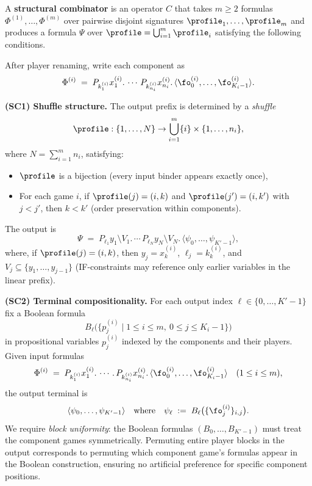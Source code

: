 \begin{definition}
\label{def:structural-combinator}
A \textbf{structural combinator} is an operator $C$ that takes $m \geq 2$ 
formulas $\Phi^{(1)}, \ldots, \Phi^{(m)}$ over pairwise disjoint signatures 
$\profile_1, \ldots, \profile_m$ and produces a formula 
$\Psi$ over $\profile = \bigcup_{i=1}^m \profile_i$ satisfying the following conditions.

After player renaming, write each component as
\[
\Phi^{(i)} \;=\; P_{k_1^{(i)}} x_1^{(i)}.\, \cdots\, P_{k_{n_i}^{(i)}} x_{n_i}^{(i)}.\,
\langle \fo_0^{(i)}, \ldots, \fo_{K_i-1}^{(i)} \rangle.
\]

\smallskip
\noindent\textbf{(SC1) Shuffle structure.}
The output prefix is determined by a \emph{shuffle} 
\[
\profile: \{1, \ldots, N\} \to \bigcup_{i=1}^m \{i\} \times \{1, \ldots, n_i\},
\]
where $N = \sum_{i=1}^m n_i$, satisfying:
\begin{itemize}[nosep]
  \item $\profile$ is a bijection (every input binder appears exactly once),
  \item For each game $i$, if $\profile(j) = (i, k)$ and $\profile(j') = (i, k')$ 
    with $j < j'$, then $k < k'$ (order preservation within components).
\end{itemize}
The output is
\[
\Psi \;=\; P_{\ell_1} y_1 \setminus V_1.\, \cdots\, P_{\ell_N} y_N \setminus V_N.\,
\langle \psi_0, \ldots, \psi_{K'-1} \rangle,
\]
where, if $\profile(j) = (i, k)$, then $y_j = x_k^{(i)}$, $\ell_j = k_k^{(i)}$, 
and $V_j \subseteq \{y_1, \ldots, y_{j-1}\}$ (IF-constraints may reference only 
earlier variables in the linear prefix).

\smallskip
\noindent\textbf{(SC2) Terminal compositionality.}
For each output index $\ell \in \{0, \ldots, K'-1\}$ fix a Boolean formula
\[
B_\ell\bigl( \{ p^{(i)}_j \mid 1 \le i \le m,\ 0 \le j \le K_i - 1 \} \bigr)
\]
in propositional variables $p^{(i)}_j$ indexed by the components and their
players. Given input formulas
\[
\Phi^{(i)} \;=\; P_{k_1^{(i)}} x_1^{(i)}.\, \cdots.\, P_{k_{n_i}^{(i)}} x_{n_i}^{(i)}.\,
\langle \fo^{(i)}_0, \ldots, \fo^{(i)}_{K_i-1} \rangle
\quad (1 \le i \le m),
\]
the output terminal is
\[
\langle \psi_0, \ldots, \psi_{K'-1} \rangle
\quad\text{where}\quad
\psi_\ell \;:=\; B_\ell\bigl( \{ \fo^{(i)}_j \}_{i,j} \bigr).
\]
We require \emph{block uniformity}: the Boolean formulas $(B_0, \ldots, B_{K'-1})$ 
must treat the component games symmetrically. Permuting entire player blocks in 
the output corresponds to permuting which component game's formulas appear in 
the Boolean construction, ensuring no artificial preference for specific component positions.


\end{definition}
